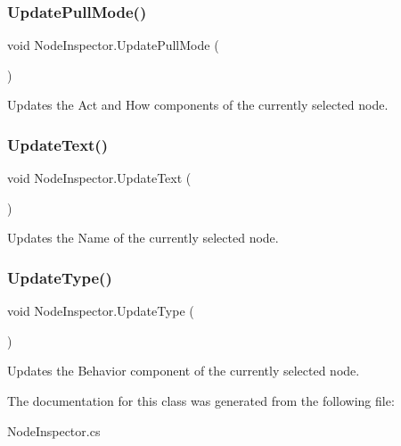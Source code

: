 \subsubsection{\texorpdfstring{Update\+Pull\+Mode()}{UpdatePullMode()}}
{\footnotesize\ttfamily void Node\+Inspector.\+Update\+Pull\+Mode (\begin{DoxyParamCaption}{ }\end{DoxyParamCaption})}



Updates the Act and How components of the currently selected node. 

\mbox{\label{class_node_inspector_a7742d3d6c097ee5c2bdaea18741da3fe}} 
\subsubsection{\texorpdfstring{Update\+Text()}{UpdateText()}}
{\footnotesize\ttfamily void Node\+Inspector.\+Update\+Text (\begin{DoxyParamCaption}{ }\end{DoxyParamCaption})}



Updates the Name of the currently selected node. 

\mbox{\label{class_node_inspector_a8e1c3d87fc6a3dc3addb0cf4eddfd7a6}} 
\subsubsection{\texorpdfstring{Update\+Type()}{UpdateType()}}
{\footnotesize\ttfamily void Node\+Inspector.\+Update\+Type (\begin{DoxyParamCaption}{ }\end{DoxyParamCaption})}



Updates the Behavior component of the currently selected node. 



The documentation for this class was generated from the following file\+:\begin{DoxyCompactItemize}
\item 
Node\+Inspector.\+cs\end{DoxyCompactItemize}
